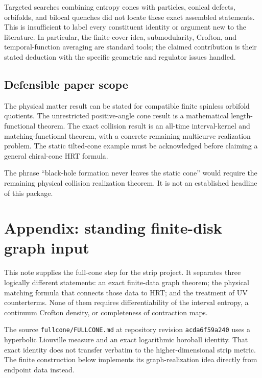 \documentclass[11pt]{article}
\begin{document}
Targeted searches combining entropy cones with particles, conical
defects, orbifolds, and bilocal quenches did not locate these exact
assembled statements. This is insufficient to label every constituent
identity or argument new to the literature. In particular, the
finite-cover idea, submodularity, Crofton, and temporal-function
averaging are standard tools; the claimed contribution is their stated
deduction with the specific geometric and regulator issues handled.

\subsection{Defensible paper scope}\label{defensible-paper-scope}

The physical matter result can be stated for compatible finite spinless
orbifold quotients. The unrestricted positive-angle cone result is a
mathematical length-functional theorem. The exact collision result is an
all-time interval-kernel and matching-functional theorem, with a
concrete remaining multicurve realization problem. The static
tilted-cone example must be acknowledged before claiming a general
chiral-cone HRT formula.

The phrase ``black-hole formation never leaves the static cone'' would
require the remaining physical collision realization theorem. It is not
an established headline of this package.

\clearpage

\section{Appendix: standing finite-disk graph
input}\label{appendix-standing-finite-disk-graph-input}

This note supplies the full-cone step for the strip project. It
separates three logically different statements: an exact finite-data
graph theorem; the physical matching formula that connects those data to
HRT; and the treatment of UV counterterms. None of them requires
differentiability of the interval entropy, a continuum Crofton density,
or completeness of contraction maps.

The source \texttt{fullcone/FULLCONE.md} at repository revision
\texttt{acda6f59a240} uses a hyperbolic Liouville measure and an exact
logarithmic horoball identity. That exact identity does not transfer
verbatim to the higher-dimensional strip metric. The finite construction
below implements its graph-realization idea directly from endpoint data
instead.
\end{document}
